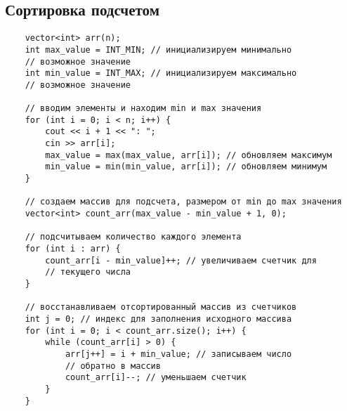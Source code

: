 \documentclass[otchet]{SCWorks}
\begin{document}
\subsection{Сортировка подсчетом}
\begin{verbatim}
    vector<int> arr(n); 
    int max_value = INT_MIN; // инициализируем минимально 
	// возможное значение
    int min_value = INT_MAX; // инициализируем максимально 
	// возможное значение

    // вводим элементы и находим min и max значения
    for (int i = 0; i < n; i++) {
        cout << i + 1 << ": ";
        cin >> arr[i];
        max_value = max(max_value, arr[i]); // обновляем максимум
        min_value = min(min_value, arr[i]); // обновляем минимум
    }

    // создаем массив для подсчета, размером от min до max значения
    vector<int> count_arr(max_value - min_value + 1, 0);

    // подсчитываем количество каждого элемента
    for (int i : arr) {
        count_arr[i - min_value]++; // увеличиваем счетчик для 
		// текущего числа
    }

    // восстанавливаем отсортированный массив из счетчиков
    int j = 0; // индекс для заполнения исходного массива
    for (int i = 0; i < count_arr.size(); i++) {
        while (count_arr[i] > 0) {
            arr[j++] = i + min_value; // записываем число 
			// обратно в массив
            count_arr[i]--; // уменьшаем счетчик
        }
    }
\end{verbatim}
\end{document}
